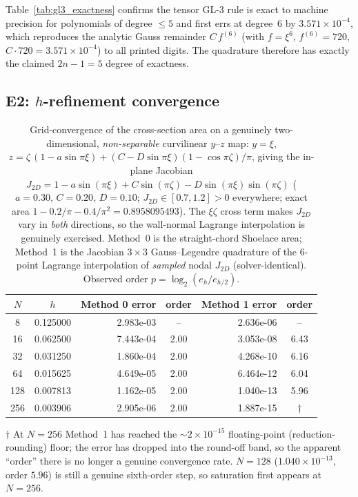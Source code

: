 \documentclass[11pt]{article}
\theoremstyle{definition}
\theoremstyle{remark}
\begin{document}
Table~\ref{tab:gl3_exactness} confirms the tensor GL-3 rule is exact to machine
precision for polynomials of degree $\le5$ and first errs at degree~6 by
$3.571\times10^{-4}$, which reproduces the analytic Gauss remainder $C\,f^{(6)}$
(with $f=\xi^6$, $f^{(6)}=720$, $C\cdot720=3.571\times10^{-4}$) to all printed
digits. The quadrature therefore has exactly the claimed $2n-1=5$ degree of
exactness.

\subsection{E2: \texorpdfstring{$h$}{h}-refinement convergence}

\begin{table}[t]
\centering
\caption{Grid-convergence of the cross-section area on a genuinely two-dimensional,
\emph{non-separable} curvilinear $y$--$z$ map: $y=\xi$,
$z=\zeta\,(1-a\sin\pi\xi)+(C-D\sin\pi\xi)(1-\cos\pi\zeta)/\pi$, giving the in-plane
Jacobian $J_{2D}=1-a\sin(\pi\xi)+C\sin(\pi\zeta)-D\sin(\pi\xi)\sin(\pi\zeta)$
($a=0.30,\,C=0.20,\,D=0.10$; $J_{2D}\in[0.7,1.2]>0$ everywhere; exact area
$1-0.2/\pi-0.4/\pi^2=0.8958095493$). The $\xi\zeta$ cross term makes $J_{2D}$ vary in
\emph{both} directions, so the wall-normal Lagrange interpolation is genuinely
exercised. Method~0 is the straight-chord Shoelace area; Method~1 is the Jacobian
$3\times3$ Gauss--Legendre quadrature of the $6$-point Lagrange interpolation of
\emph{sampled} nodal $J_{2D}$ (solver-identical). Observed order
$p=\log_2(e_{h}/e_{h/2})$.}
\label{tab:gl3_convergence}
\begin{tabular}{c c r c r c}
\toprule
$N$ & $h$ & {Method 0 error} & {order} & {Method 1 error} & {order} \\
\midrule
  8 & 0.125000 & 2.983e-03 & {--}   & 2.636e-06 & {--}   \\
 16 & 0.062500 & 7.443e-04 & 2.00   & 3.053e-08 & 6.43   \\
 32 & 0.031250 & 1.860e-04 & 2.00   & 4.268e-10 & 6.16   \\
 64 & 0.015625 & 4.649e-05 & 2.00   & 6.464e-12 & 6.04   \\
128 & 0.007813 & 1.162e-05 & 2.00   & 1.040e-13 & 5.96   \\
256 & 0.003906 & 2.905e-06 & 2.00   & 1.887e-15 & {$\dagger$} \\
\bottomrule
\end{tabular}
\par\smallskip
\footnotesize $\dagger$ At $N{=}256$ Method~1 has reached the
$\sim\!2\times10^{-15}$ floating-point (reduction-rounding) floor; the error has
dropped into the round-off band, so the apparent ``order'' there is no longer a
genuine convergence rate. $N{=}128$ ($1.040\times10^{-13}$, order $5.96$) is still a
genuine sixth-order step, so saturation first appears at $N{=}256$.
\end{table}
\end{document}
